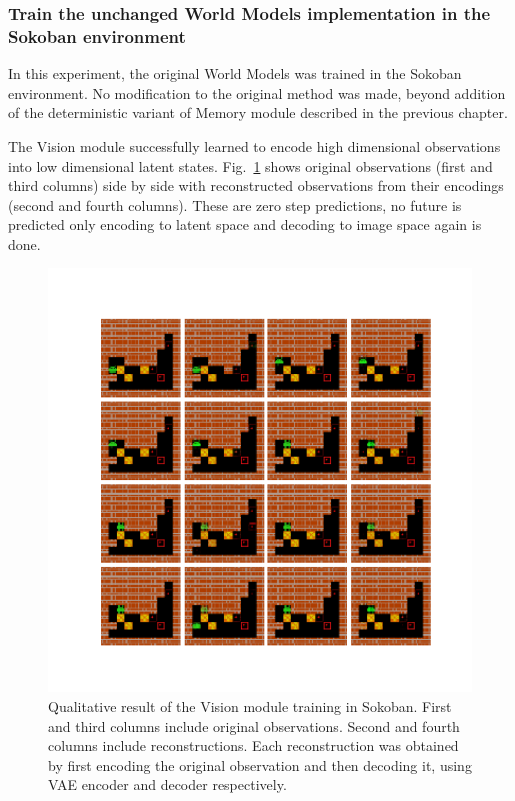 \subsubsection{Train the unchanged World Models implementation in the Sokoban environment}

In this experiment, the original World Models was trained in the Sokoban environment. No modification to the original method was made, beyond addition of the deterministic variant of Memory module described in the previous chapter.

The Vision module successfully learned to encode high dimensional observations into low dimensional latent states. Fig.~\ref{Fig.WM_Sokoban_vision} shows original observations (first and third columns) side by side with reconstructed observations from their encodings (second and fourth columns). These are zero step predictions, no future is predicted only encoding to latent space and decoding to image space again is done.

\begin{figure}[H]
\includegraphics[width=1\textwidth,keepaspectratio]{figures/Sokoban_vision.png}
\caption[Qualitative result of the World Models' Vision module training in Sokoban]{Qualitative result of the Vision module training in Sokoban. First and third columns include original observations. Second and fourth columns include reconstructions. Each reconstruction was obtained by first encoding the original observation and then decoding it, using VAE encoder and decoder respectively.}
\label{Fig.WM_Sokoban_vision}
\end{figure}

